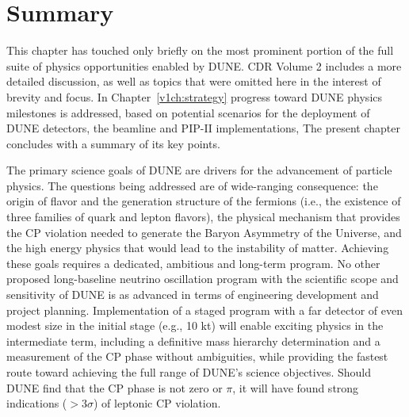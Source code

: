 
%
\section{Summary}


This chapter has touched only briefly on the most prominent portion of
the full suite of physics opportunities enabled by DUNE.  
CDR Volume 2 includes a more detailed discussion, as well as topics
that were omitted here in the interest of brevity and focus.  In
Chapter~\ref{v1ch:strategy} progress toward DUNE physics milestones is
addressed, based on potential scenarios for the deployment of DUNE
detectors, the beamline and PIP-II implementations, The present
chapter concludes with a summary of its key points.

The primary science goals of DUNE are drivers for the advancement of
particle physics. The questions being addressed are of wide-ranging
consequence: the origin of flavor and the generation structure of the
fermions (i.e., the existence of three families of quark and lepton
flavors), the physical mechanism that provides the CP violation needed
to generate the Baryon Asymmetry of the Universe, and the high energy
physics that would lead to the instability of matter.  Achieving these
goals requires a dedicated, ambitious and long-term program.  No other
proposed long-baseline neutrino oscillation program with the
scientific scope and sensitivity of DUNE is as advanced in terms of
engineering development and project planning.  Implementation of a
staged program with a far detector of even modest size in the initial
stage (e.g., 10 kt) will enable exciting physics in the intermediate
term, including a definitive mass hierarchy determination and a
measurement of the CP phase without ambiguities, while providing the
fastest route toward achieving the full range of DUNE's science
objectives.  Should DUNE find that the CP phase is not zero or $\pi$,
it will have found strong indications ($>3\sigma$) of leptonic CP
violation.

